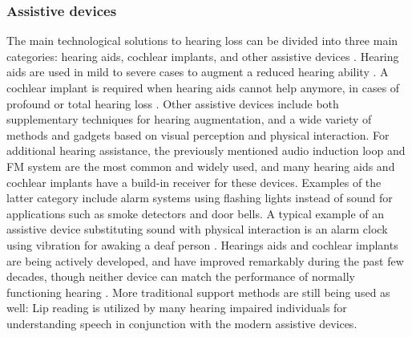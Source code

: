 \documentclass[english, 12pt, a4paper, pdftex, elec, utf8]{aaltothesis}
\begin{document}
\subsubsection{Assistive devices}

The main technological solutions to hearing loss can be divided into three main categories: hearing aids, cochlear implants, and other assistive devices \cite{moore2007cochlear}. Hearing aids are used in mild to severe cases to augment a reduced hearing ability \cite{moore2007cochlear, levitt2007historical}. A cochlear implant is required when hearing aids cannot help anymore, in cases of profound or total hearing loss \cite{moore2007cochlear, levitt2007historical}. Other assistive devices include both supplementary techniques for hearing augmentation, and a wide variety of methods and gadgets based on visual perception and physical interaction. For additional hearing assistance, the previously mentioned audio induction loop and FM system are the most common and widely used, and many hearing aids and cochlear implants have a build-in receiver for these devices. Examples of the latter category include alarm systems using flashing lights instead of sound for applications such as smoke detectors and door bells. A typical example of an assistive device substituting sound with physical interaction is an alarm clock using vibration for awaking a deaf person \cite{mielke2013assistive}. Hearings aids and cochlear implants are being actively developed, and have improved remarkably during the past few decades, though neither device can match the performance of normally functioning hearing \cite{moore2007cochlear, levitt2007historical, goehring2016speech}. More traditional support methods are still being used as well: Lip reading is utilized by many hearing impaired individuals for understanding speech in conjunction with the modern assistive devices. \\\\
\end{document}
